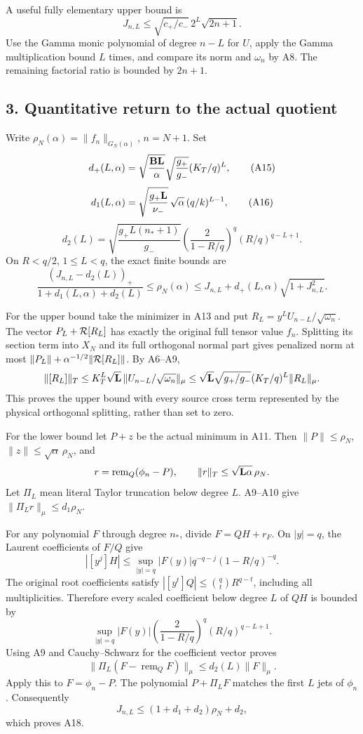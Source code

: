 \documentclass[11pt]{article}
\begin{document}
A useful fully elementary upper bound is \[
 J_{n,L}\le
 \sqrt{c_+/c_-}\,2^L\sqrt{2n+1}.
 \tag{A14}
\] Use the Gamma monic polynomial of degree \(n-L\) for \(U\), apply the Gamma multiplication bound \(L\) times, and compare its norm and \(\omega_n\) by A8. The remaining factorial ratio is bounded by \(2n+1\).

\subsection{3. Quantitative return to the actual quotient}\label{quantitative-return-to-the-actual-quotient}

Write \(\rho_N(\alpha)=\|f_n\|_{G_N(\alpha)}\), \(n=N+1\). Set \[
 d_+(L,\alpha)
 =\sqrt{\frac{{\bf B}{\bf L}}{\alpha}}
       \sqrt{\frac{g_+}{g_-}}(K_T/q)^L,
 \tag{A15}
\] \[
 d_1(L,\alpha)
 =\sqrt{\frac{g_+{\bf L}}{\nu_-}}\,
       \sqrt\alpha\,(q/k)^{L-1},
 \tag{A16}
\] \[
 d_2(L)=
 \sqrt{\frac{g_+L(n_*+1)}{g_-}}
 \left(\frac2{1-R/q}\right)^q
 (R/q)^{q-L+1}.
 \tag{A17}
\] On \(R<q/2\), \(1\le L<q\), the exact finite bounds are \[
 \boxed{
 \frac{(J_{n,L}-d_2(L))_+}{1+d_1(L,\alpha)+d_2(L)}
 \le\rho_N(\alpha)
 \le J_{n,L}+d_+(L,\alpha)\sqrt{1+J_{n,L}^2}.
 }\tag{A18}
\]

For the upper bound take the minimizer in A13 and put \(R_L=y^LU_{n-L}/\sqrt{\omega_n}\). The vector \(P_L+{\cal R}[R_L]\) has exactly the original full tensor value \(f_n\). Splitting its section term into \(X_N\) and its full orthogonal normal part gives penalized norm at most \(\|P_L\|+\alpha^{-1/2}\|{\cal R}[R_L]\|\). By A6--A9, \[
 \|[R_L]\|_T
 \le K_T^L\sqrt{\bf L}\,\|U_{n-L}/\sqrt{\omega_n}\|_\mu
 \le \sqrt{\bf L}\sqrt{g_+/g_-}(K_T/q)^L\|R_L\|_\mu .
\] This proves the upper bound with every source cross term represented by the physical orthogonal splitting, rather than set to zero.

For the lower bound let \(P+z\) be the actual minimum in A11. Then \(\|P\|\le\rho_N\), \(\|z\|\le\sqrt\alpha\,\rho_N\), and \[
 r=\operatorname{rem}_Q(\phi_n-P),\qquad
 \|r\|_T\le\sqrt{{\bf L}\alpha}\,\rho_N.
\] Let \(\Pi_L\) mean literal Taylor truncation below degree \(L\). A9--A10 give \(\|\Pi_Lr\|_\mu\le d_1\rho_N\).

For any polynomial \(F\) through degree \(n_*\), divide \(F=QH+r_F\). On \(|y|=q\), the Laurent coefficients of \(F/Q\) give \[
 |[y^j]H|
 \le \sup_{|y|=q}|F(y)|q^{-q-j}(1-R/q)^{-q}.
\] The original root coefficients satisfy \(|[y^t]Q|\le\binom qtR^{q-t}\), including all multiplicities. Therefore every scaled coefficient below degree \(L\) of \(QH\) is bounded by \[
 \sup_{|y|=q}|F(y)|
 \left(\frac2{1-R/q}\right)^q(R/q)^{q-L+1}.
\] Using A9 and Cauchy--Schwarz for the coefficient vector proves \[
 \|\Pi_L(F-\operatorname{rem}_QF)\|_\mu\le d_2(L)\|F\|_\mu.
\] Apply this to \(F=\phi_n-P\). The polynomial \(P+\Pi_LF\) matches the first \(L\) jets of \(\phi_n\). Consequently \[
 J_{n,L}\le(1+d_1+d_2)\rho_N+d_2,
\] which proves A18.
\end{document}
